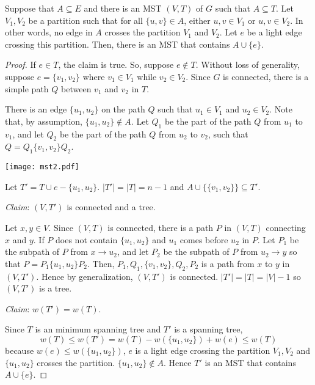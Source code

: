\begin{theorem} \label{thm:mst-correctness}
    Suppose that $A \subseteq E$ and there is an MST $(V,T)$ of $G$ such that $A \subseteq T$. Let $V_1,V_2$ be a partition such that for all $\{u,v\} \in A$, either $u,v \in V_1$ or $u,v \in V_2$. In other words, no edge in $A$ crosses the partition $V_1$ and $V_2$. Let $e$ be a light edge crossing this partition. Then, there is an MST that contains $A \cup \{e\}$.
\end{theorem}

\begin{proof}
    If $e \in T$, the claim is true. So, suppose $e \not\in T$. Without loss of generality, suppose $e = \{v_1,v_2\}$ where $v_1 \in V_1$ while $v_2 \in V_2$. Since $G $ is connected, there is a simple path $Q$ between $v_1$ and $v_2$ in $T$.

    There is an edge $\{u_1,u_2\}$ on the path $Q$ such that $u_1 \in V_1$ and $u_2 \in V_2$. Note that, by assumption, $\{u_1,u_2\} \not\in A$. Let $Q_1$ be the part of the path $Q$ from $u_1$ to $v_1$, and let $Q_2$ be the part of the path $Q$ from $u_2$ to $v_2$, such that $Q = Q_1 \{v_1,v_2\} Q_2$.

    \begin{center}
        \texttt{[image: mst2.pdf]}
    \end{center}

    Let $T' = T \cup {e} - \{u_1,u_2\}$. $|T'| = |T| = n-1$ and $A \cup \{\{v_1,v_2\}\} \subseteq T'$.
    
    \textit{Claim}: $(V,T')$ is connected and a tree.

    Let $x,y \in V$. Since $(V,T)$ is connected, there is a path $P$ in $(V,T)$ connecting $x$ and $y$. If $P$ does not contain $\{u_1,u_2\}$ and $u_1$ comes before $u_2$ in $P$. Let $P_1$ be the subpath of $P$ from $x \to u_2$, and let $P_2$ be the subpath of $P$ from $u_2 \to y$ so that $P=P_1 \{u_1,u_2\} P_2$. Then, $P_1,Q_1, \{v_1,v_2\}, Q_2, P_2$ is a path from $x$ to $y$ in $(V,T')$. Hence by generalization, $(V,T')$ is connected. $|T'| = |T| = |V| - 1$ so $(V,T')$ is a tree.

    \textit{Claim}: $w(T') = w(T)$.

    Since $T$ is an minimum spanning tree and $T'$ is a spanning tree,
    $$
    w(T) \leq w(T') = w(T) - w(\{ u_1, u_2 \}) + w(e) \leq w(T)
    $$
    because $w(e) \leq w(\{u_1, u_2 \})$, $e$ is a light edge crossing the partition $V_1,V_2$ and $\{u_1, u_2\}$ crosses the partition. $\{u_1,u_2\} \not\in A$. Hence $T'$ is an MST that contains $A \cup \{e\}$.
\end{proof}

